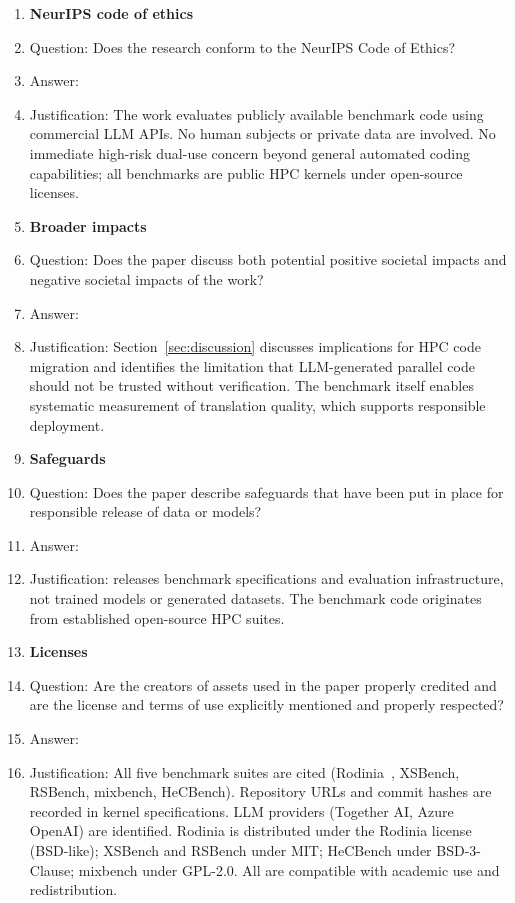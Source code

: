 {\begin{enumerate}
\item {\bf NeurIPS code of ethics}
    \item[] Question: Does the research conform to the NeurIPS Code of Ethics?
    \item[] Answer: \answerYes{}
    \item[] Justification: The work evaluates publicly available benchmark code using commercial LLM APIs. No human subjects or private data are involved. No immediate high-risk dual-use concern beyond general automated coding capabilities; all benchmarks are public HPC kernels under open-source licenses.

\item {\bf Broader impacts}
    \item[] Question: Does the paper discuss both potential positive societal impacts and negative societal impacts of the work?
    \item[] Answer: \answerYes{}
    \item[] Justification: Section~\ref{sec:discussion} discusses implications for HPC code migration and identifies the limitation that LLM-generated parallel code should not be trusted without verification. The benchmark itself enables systematic measurement of translation quality, which supports responsible deployment.

\item {\bf Safeguards}
    \item[] Question: Does the paper describe safeguards that have been put in place for responsible release of data or models?
    \item[] Answer: \answerNA{}
    \item[] Justification: \parbench{} releases benchmark specifications and evaluation infrastructure, not trained models or generated datasets. The benchmark code originates from established open-source HPC suites.

\item {\bf Licenses}
    \item[] Question: Are the creators of assets used in the paper properly credited and are the license and terms of use explicitly mentioned and properly respected?
    \item[] Answer: \answerYes{}
    \item[] Justification: All five benchmark suites are cited (Rodinia~\cite{Rodinia2009}, XSBench, RSBench, mixbench, HeCBench). Repository URLs and commit hashes are recorded in kernel specifications. LLM providers (Together AI, Azure OpenAI) are identified. Rodinia is distributed under the Rodinia license (BSD-like); XSBench and RSBench under MIT; HeCBench under BSD-3-Clause; mixbench under GPL-2.0. All are compatible with academic use and redistribution.
    

\end{enumerate}}
